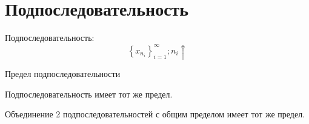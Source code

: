 \section{Подпоследовательность}
\begin{Def}
Подпоследовательность:
$$\left\{x_{n_i}\right\}_{i=1}^\infty; {n_i} \uparrow$$
\end{Def}

\begin{theorem}{Предел подпоследовательности}

Подпоследовательность имеет тот же предел.

Объединение 2 подпоследовательностей с общим пределом имеет тот же предел.
\end{theorem}